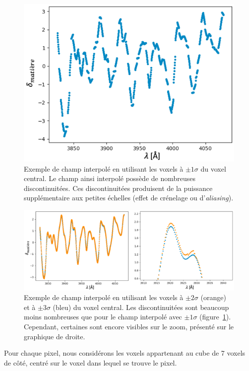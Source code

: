 \begin{figure}
  \centering
  \includegraphics[scale=0.5]{smoothing11}
  \caption{Exemple de champ interpolé en utilisant les voxels à $\pm 1 \sigma$ du voxel central. Le champ ainsi interpolé possède de nombreuses discontinuitées. Ces discontinuitées produisent de la puissance supplémentaire aux petites échelles (effet de crénelage ou d'\emph{aliasing}).}
  \label{fig:smoothing11}
\end{figure}
\begin{figure}
  \centering
  \includegraphics[scale=0.4]{smoothing23}
  \caption{Exemple de champ interpolé en utilisant les voxels à $\pm 2 \sigma$ (orange) et à $\pm 3 \sigma$ (bleu) du voxel central. Les discontinuitées sont beaucoup moins nombreuses que pour le champ interpolé avec $\pm 1 \sigma$ (figure~\ref{fig:smoothing11}). Cependant, certaines sont encore visibles sur le zoom, présenté sur le graphique de droite.}
  \label{fig:smoothing23}
\end{figure}
Pour chaque pixel, nous considérons les voxels appartenant au cube de 7 voxels de côté, centré sur le voxel dans lequel se trouve le pixel. %
